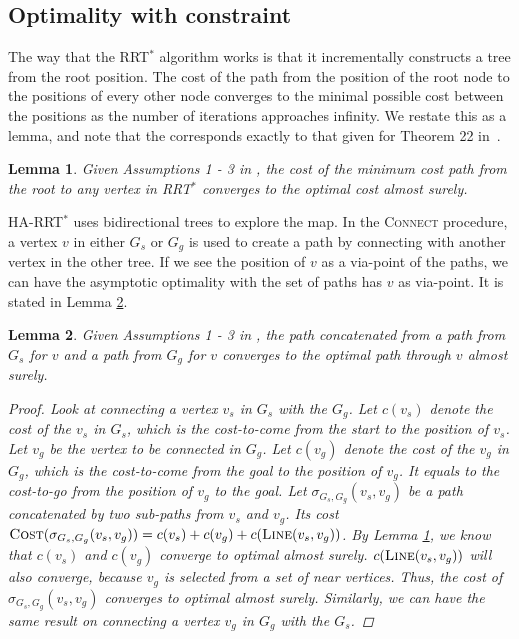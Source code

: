 \documentclass[letterpaper, 10 pt, conference]{ieeeconf}
\newtheorem{lem}{Lemma}
\begin{document}
\subsection{Optimality with constraint}
\label{sec:optimality_constraint}

The way that the RRT$^{*}$ algorithm works is that it incrementally constructs a tree from the root position.  
The cost of the path from the position of the root node to the positions of every other node converges to the minimal possible cost between the positions as the number of iterations approaches infinity.  
We restate this as a lemma, and note that the corresponds exactly to that given for Theorem 22 in~\cite{Karaman-RSS-10}.
\begin{lem}
	\label{lem:tree_vex:conv}
	Given Assumptions 1 - 3 in \cite{Karaman-RSS-10},
	the cost of the minimum cost path from the root to any vertex in RRT$^{*}$ converges to the optimal cost almost surely.
\end{lem}

HA-RRT$^{*}$ uses bidirectional trees to explore the map.
In the \textsc{Connect} procedure, a vertex $ v $ in either $ G_{s} $ or $ G_{g} $ is used to create a path by connecting with another vertex in the other tree.
If we see the position of $ v $ as a via-point of the paths, we can have the asymptotic optimality with the set of paths has $ v $ as via-point.
It is stated in Lemma \ref{lem:optimal_via_point}.

\begin{lem}
	\label{lem:optimal_via_point}
	Given Assumptions 1 - 3 in \cite{Karaman-RSS-10},
	the path concatenated from a path from $ G_{s} $ for $ v $ and a path from $ G_{g} $ for $ v $ converges to the optimal path through $ v $ almost surely. 
	
	\begin{proof}
		Look at connecting a vertex $ v_{s} $ in $ G_{s} $ with the $ G_{g} $.
		Let $ c (v_{s}) $ denote the cost of the $  v_{s}  $ in $ G_{s} $, which is the cost-to-come from the start to the position of $  v_{s} $.
		Let $ v_{g} $ be the vertex to be connected in $ G_{g} $.
		Let $ c ( v_{g} ) $ denote the cost of the $  v_{g} $ in $ G_{g} $, which is the cost-to-come from the goal to the position of $  v_{g} $.
		It equals to the cost-to-go from the position of $ v_{g} $ to the goal.
		Let $ \sigma_{G_{s},G_{g}} (v_{s}, v_{g}) $ be a path concatenated by two sub-paths from $  v_{s} $ and $  v_{g} $. 
		Its cost $ \mbox{\sc Cost} (\sigma_{G_{s},G_{g}} ( v_{s}, v_{g} )) =  c (v_{s}) + c (v_{g}) + c (\mbox{\sc Line} (v_{s}, v_{g}) ) $.
		By Lemma \ref{lem:tree_vex:conv}, we know that $ c (v_{s}) $ and $ c (v_{g}) $ converge to optimal almost surely.
		$ c (\mbox{\sc Line} (v_{s}, v_{g})  ) $ will also converge, because $ v_{g} $ is selected from a set of near vertices.
		Thus, the cost of $ \sigma_{G_{s},G_{g}} (v_{s}, v_{g}) $ converges to optimal almost surely. 
		Similarly, we can have the same result on connecting a vertex $ v_{g} $ in $ G_{g} $ with the $ G_{s} $.
	\end{proof}
\end{lem}
\end{document}
